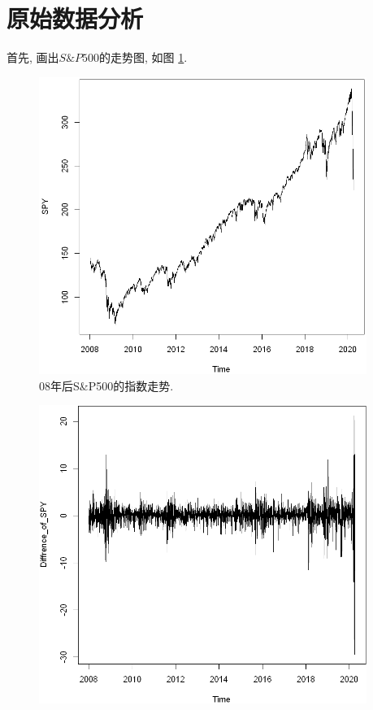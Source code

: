 \documentclass[12pt]{article}
\begin{document}
\section{原始数据分析}
\qquad 首先, 画出$S\&P500$的走势图, 如图 \ref{fig:1}.
\begin{center}
    \hspace{30pt}\begin{minipage}{0.45\textwidth}
        \begin{figure}
            \centering
            \hspace{-30pt}\includegraphics[width=0.95\textwidth]{output_3_0}
            \caption{08年后S\&P500的指数走势.\label{fig:1}}
        \end{figure}
    \end{minipage}
    \begin{minipage}{0.45\textwidth}
        \begin{figure}
            \centering
            \hspace{-25pt}\includegraphics[width=0.95\textwidth]{output_4_0}

\end{figure}
\end{minipage}
\end{center}
\end{document}
